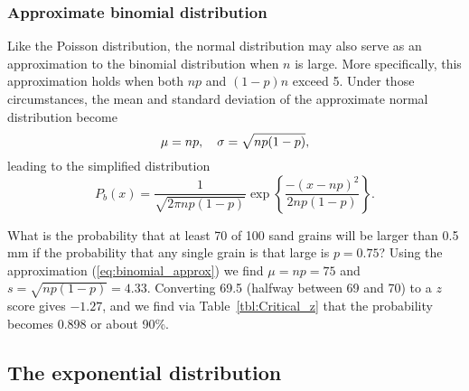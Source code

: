 \subsubsection{Approximate binomial distribution}
	Like the Poisson distribution, the normal distribution may also serve as an approximation to the binomial distribution
when $n$ is large. More specifically, this approximation holds when both $np$ and $(1 - p)n$ exceed 5.  Under those circumstances,
the mean and standard deviation of the approximate normal distribution become
\begin{equation}
	\index{Binomial probability distribution!approximation}
\mu = np, \quad \sigma = \sqrt{np(1-p)},
\label{eq:binomial_approx}
\end{equation}	 
leading to the simplified distribution
\begin{equation}
P_b(x) = \frac{1}{\sqrt{2 \pi np (1- p)}} \exp{\left \{ \frac{-(x-np)^2}{2 np (1-p)}\right \}}.
\label{eq:binomial_approx_norm}
\end{equation}
\begin{example}
What is the probability that at least 70 of 100 sand grains will be larger than 0.5 mm if 
the probability that any single grain is that large is $p = 0.75$?  Using the approximation (\ref{eq:binomial_approx}) we 
find $\mu = np = 75$ and $s   = \sqrt{np(1-p)} = 4.33$.  Converting 69.5 (halfway between 69 and 70) to a $z$ 
score gives $-1.27$, and we find via Table~\ref{tbl:Critical_z} that the probability becomes 0.898 or about 90\%.
\end{example}

\subsection{The exponential distribution}

